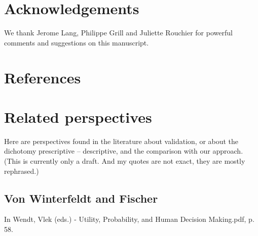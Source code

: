 \documentclass[preprint, french, english, 11pt, authoryear]{elsarticle}%
\begin{document}


\section*{Acknowledgements}
We thank Jerome Lang, Philippe Grill and Juliette Rouchier for powerful comments and suggestions on this manuscript.

\section*{References}



\renewcommand*{\appendixname}{}
\appendix

\section{Related perspectives}
\label{sec-related}
Here are perspectives found in the literature about validation, or about the dichotomy prescriptive – descriptive, and the comparison with our approach. (This is currently only a draft. And my quotes are not exact, they are mostly rephrased.)

\subsection{Von Winterfeldt and Fischer}
In Wendt, Vlek (eds.) - Utility, Probability, and Human Decision Making.pdf, p. 58.
\end{document}
